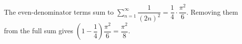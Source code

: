 The even-denominator terms sum to $\sum_{n=1}^{\infty}\dfrac{1}{(2n)^2}=\dfrac{1}{4}\cdot\dfrac{\pi^2}{6}$. Removing them from the full sum gives $\left(1-\dfrac{1}{4}\right)\dfrac{\pi^2}{6}=\boxed{\dfrac{\pi^2}{8}}$.
